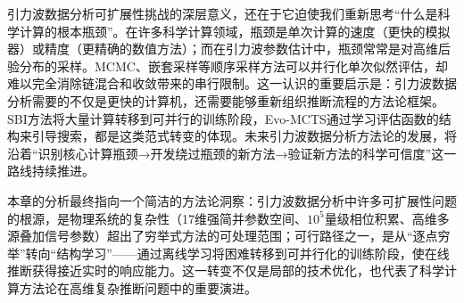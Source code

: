 引力波数据分析可扩展性挑战的深层意义，还在于它迫使我们重新思考“什么是科学计算的根本瓶颈”。在许多科学计算领域，瓶颈是单次计算的速度（更快的模拟器）或精度（更精确的数值方法）；而在引力波参数估计中，瓶颈常常是对高维后验分布的采样。MCMC、嵌套采样等顺序采样方法可以并行化单次似然评估，却难以完全消除链混合和收敛带来的串行限制。这一认识的重要启示是：引力波数据分析需要的不仅是更快的计算机，还需要能够重新组织推断流程的方法论框架。SBI方法将大量计算转移到可并行的训练阶段，Evo-MCTS通过学习评估函数的结构来引导搜索，都是这类范式转变的体现。未来引力波数据分析方法论的发展，将沿着“识别核心计算瓶颈→开发绕过瓶颈的新方法→验证新方法的科学可信度”这一路线持续推进。

本章的分析最终指向一个简洁的方法论洞察：引力波数据分析中许多可扩展性问题的根源，是物理系统的复杂性（17维强简并参数空间、$10^5$量级相位积累、高维多源叠加信号参数）超出了穷举式方法的可处理范围；可行路径之一，是从“逐点穷举”转向“结构学习”——通过离线学习将困难转移到可并行化的训练阶段，使在线推断获得接近实时的响应能力。这一转变不仅是局部的技术优化，也代表了科学计算方法论在高维复杂推断问题中的重要演进。
